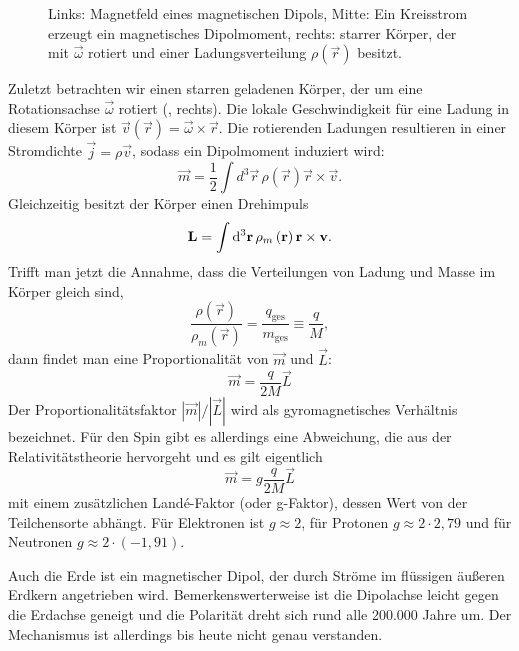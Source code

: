 \begin{figure}[htb]
	\centering
	\tfigMagnDipoleFieldCircleConductorEllipsoid
	\caption{Links: Magnetfeld eines magnetischen Dipols, Mitte: Ein Kreisstrom erzeugt ein magnetisches Dipolmoment, rechts: starrer Körper, der mit $\vec\omega$ rotiert und einer Ladungsverteilung $\rho(\vec r)$ besitzt. }
	\label{fig:magnetic_dipole_field_circle_conductor_ellipsoid}
\end{figure}

Zuletzt betrachten wir einen starren geladenen Körper, der um eine Rotationsachse $\vec {\omega }$ rotiert (, rechts). Die lokale Geschwindigkeit für eine Ladung in diesem Körper ist $\vec {v}\left(\vec {r}\right)=\vec {\omega }\times \vec {r}$. Die rotierenden Ladungen resultieren in einer Stromdichte $\vec {j}=\rho \vec {v}$, sodass ein Dipolmoment induziert wird:
\begin{equation*}
	\vec {m}=\frac{1}{2}\int d^{3}\vec {r}\,\rho \left(\vec {r}\right)\vec {r}\times \vec {v}.
\end{equation*}
Gleichzeitig besitzt der Körper einen Drehimpuls
\begin{equation*}
	\vec {L}=\int \diffa[3]{\vec{r}}\rho _{m}\left(\vec {r}\right)\vec {r}\times \vec {v}.
\end{equation*}
Trifft man jetzt die Annahme, dass die Verteilungen von Ladung und Masse im Körper gleich sind,
\begin{equation*}
	\frac{\rho \left(\vec {r}\right)}{\rho _{m}\left(\vec {r}\right)}=\frac{q_{\mathrm{ges}}}{m_{\mathrm{ges}}}\equiv \frac{q}{M},
\end{equation*}
dann findet man eine Proportionalität von $\vec {m}$ und $\vec {L}$:
\begin{equation*}
	\vec {m}=\frac{q}{2M}\vec {L}
\end{equation*}
Der Proportionalitätsfaktor $\left| \vec {m}\right| /\left| \vec {L}\right| $ wird als gyromagnetisches Verhältnis bezeichnet. Für den Spin gibt es allerdings eine Abweichung, die aus der Relativitätstheorie hervorgeht und es gilt eigentlich
\begin{equation*}
	\vec {m}=g\frac{q}{2M}\vec {L}
\end{equation*}
mit einem zusätzlichen Landé-Faktor (oder g-Faktor), dessen Wert von der Teilchensorte abhängt. Für Elektronen ist $g\approx 2$, für Protonen $g\approx 2\cdot 2,79$ und für Neutronen $g\approx 2\cdot \left(-1,91\right)$.

Auch die Erde ist ein magnetischer Dipol, der durch Ströme im flüssigen äußeren Erdkern angetrieben wird. Bemerkenswerterweise ist die Dipolachse leicht gegen die Erdachse geneigt und die Polarität dreht sich rund alle 200.000 Jahre um. Der Mechanismus ist allerdings bis heute nicht genau verstanden.

